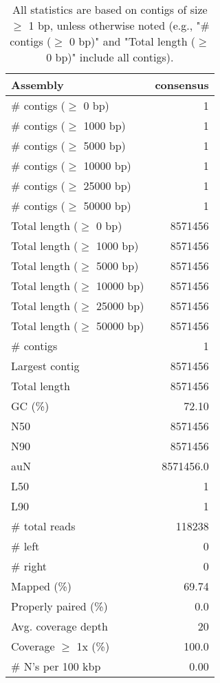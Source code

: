 \documentclass[12pt,a4paper]{article}
\begin{document}
\begin{table}[ht]
\begin{center}
\caption{All statistics are based on contigs of size $\geq$ 1 bp, unless otherwise noted (e.g., "\# contigs ($\geq$ 0 bp)" and "Total length ($\geq$ 0 bp)" include all contigs).}
\begin{tabular}{|l*{1}{|r}|}
\hline
Assembly & consensus \\ \hline
\# contigs ($\geq$ 0 bp) & 1 \\ \hline
\# contigs ($\geq$ 1000 bp) & 1 \\ \hline
\# contigs ($\geq$ 5000 bp) & 1 \\ \hline
\# contigs ($\geq$ 10000 bp) & 1 \\ \hline
\# contigs ($\geq$ 25000 bp) & 1 \\ \hline
\# contigs ($\geq$ 50000 bp) & 1 \\ \hline
Total length ($\geq$ 0 bp) & 8571456 \\ \hline
Total length ($\geq$ 1000 bp) & 8571456 \\ \hline
Total length ($\geq$ 5000 bp) & 8571456 \\ \hline
Total length ($\geq$ 10000 bp) & 8571456 \\ \hline
Total length ($\geq$ 25000 bp) & 8571456 \\ \hline
Total length ($\geq$ 50000 bp) & 8571456 \\ \hline
\# contigs & 1 \\ \hline
Largest contig & 8571456 \\ \hline
Total length & 8571456 \\ \hline
GC (\%) & 72.10 \\ \hline
N50 & 8571456 \\ \hline
N90 & 8571456 \\ \hline
auN & 8571456.0 \\ \hline
L50 & 1 \\ \hline
L90 & 1 \\ \hline
\# total reads & 118238 \\ \hline
\# left & 0 \\ \hline
\# right & 0 \\ \hline
Mapped (\%) & 69.74 \\ \hline
Properly paired (\%) & 0.0 \\ \hline
Avg. coverage depth & 20 \\ \hline
Coverage $\geq$ 1x (\%) & 100.0 \\ \hline
\# N's per 100 kbp & 0.00 \\ \hline
\end{tabular}
\end{center}
\end{table}
\end{document}
